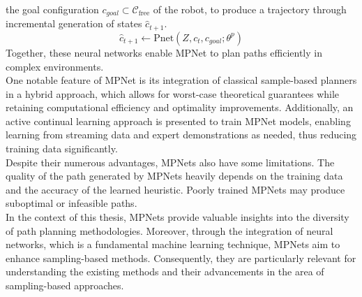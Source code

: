 \documentclass{ctuthesis}
\begin{document}
the goal configuration \(c_{goal} \subset \mathcal{C}_{\text{free}}\) of the robot, 
to produce a trajectory through incremental generation of 
states \( \hat{c}_{t+1} \).
\[
  \hat{c}_{t+1} \leftarrow \text{Pnet}(Z, c_t, c_{goal}; \theta^p)  
\]
Together, these neural networks enable MPNet to plan paths efficiently in complex environments.
\\[12pt]
One notable feature of MPNet is its integration of classical 
sample-based planners in a hybrid approach, 
which allows for worst-case theoretical guarantees while retaining computational efficiency and 
optimality improvements. 
Additionally, an active continual learning approach is presented to train MPNet models, 
enabling learning from streaming data and expert demonstrations as needed, 
thus reducing training data significantly.
\\[12pt]
Despite their numerous advantages, MPNets also have some limitations. 
The quality of the path generated by MPNets heavily depends on the training data and 
the accuracy of the learned heuristic. 
Poorly trained MPNets may produce suboptimal or infeasible paths. 
\\[12pt]
In the context of this thesis, 
MPNets provide valuable insights into the diversity of path planning methodologies. 
Moreover, through the integration of neural networks, 
which is a fundamental machine learning technique, 
MPNets aim to enhance sampling-based methods. 
Consequently, they are particularly relevant for understanding the existing methods and 
their advancements in the area of sampling-based approaches.

\end{document}
